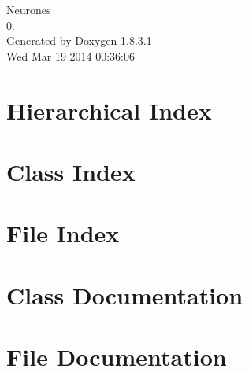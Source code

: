 \documentclass{book}
\begin{document}
\hypersetup{pageanchor=false,citecolor=blue}
\begin{titlepage}
\vspace*{7cm}
\begin{center}
{\Large Neurones \\[1ex]\large 0. }\\
\vspace*{1cm}
{\large Generated by Doxygen 1.8.3.1}\\
\vspace*{0.5cm}
{\small Wed Mar 19 2014 00:36:06}\\
\end{center}
\end{titlepage}
\clearemptydoublepage
{}
\tableofcontents
\clearemptydoublepage
{}
\hypersetup{pageanchor=true,citecolor=blue}
\chapter{Hierarchical Index}

\chapter{Class Index}

\chapter{File Index}

\chapter{Class Documentation}














\chapter{File Documentation}
























\printindex
\end{document}
